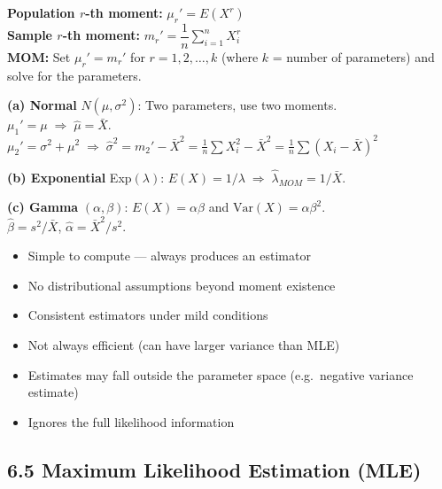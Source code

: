 \documentclass[12pt]{article}
\begin{document}
\begin{defbox}
\textbf{Population $r$-th moment:} $\mu_r'=E(X^r)$\\
\textbf{Sample $r$-th moment:} $m_r'=\dfrac{1}{n}\sum_{i=1}^n X_i^r$\\[6pt]
\textbf{MOM:} Set $\mu_r'=m_r'$ for $r=1,2,\ldots,k$ (where $k$ = number of parameters) and solve for the parameters.
\end{defbox}

\begin{examplebox}
\textbf{(a) Normal} $N(\mu,\sigma^2)$: Two parameters, use two moments.\\
$\mu_1'=\mu\;\Rightarrow\;\hat\mu=\bar X$. \quad $\mu_2'=\sigma^2+\mu^2\;\Rightarrow\;\hat\sigma^2=m_2'-\bar X^2=\frac{1}{n}\sum X_i^2-\bar X^2=\frac{1}{n}\sum(X_i-\bar X)^2$

\medskip
\textbf{(b) Exponential} Exp$(\lambda)$: $E(X)=1/\lambda\;\Rightarrow\;\hat\lambda_{MOM}=1/\bar X$.

\medskip
\textbf{(c) Gamma} $(\alpha,\beta)$: $E(X)=\alpha\beta$ and $\text{Var}(X)=\alpha\beta^2$.\\
$\hat\beta=s^2/\bar X$, \quad $\hat\alpha=\bar X^2/s^2$.
\end{examplebox}

\begin{prosbox}
\begin{itemize}[noitemsep]
  \item Simple to compute --- always produces an estimator
  \item No distributional assumptions beyond moment existence
  \item Consistent estimators under mild conditions
\end{itemize}
\end{prosbox}

\begin{consbox}
\begin{itemize}[noitemsep]
  \item Not always efficient (can have larger variance than MLE)
  \item Estimates may fall outside the parameter space (e.g.\ negative variance estimate)
  \item Ignores the full likelihood information
\end{itemize}
\end{consbox}

\subsection{6.5 Maximum Likelihood Estimation (MLE)}
\end{document}
